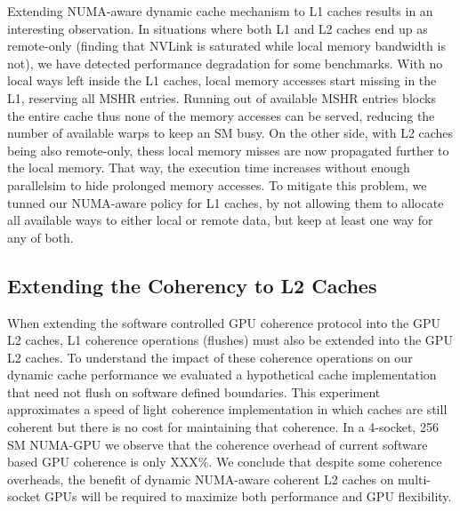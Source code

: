Extending NUMA-aware dynamic cache mechanism to L1 caches results in an interesting observation. In situations where both L1 and L2 caches end up as remote-only (finding that NVLink is saturated while local memory bandwidth is not), we have detected performance degradation for some benchmarks. With no local ways left inside the L1 caches, local memory accesses start missing in the L1, reserving all MSHR entries. Running out of available MSHR entries blocks the entire cache thus none of the memory accesses can be served, reducing the number of available warps to keep an SM busy. On the other side, with L2 caches being also remote-only, thess local memory misses are now propagated further to the local memory. That way, the execution time increases without enough parallelsim to hide prolonged memory accesses. To mitigate this problem, we tunned our NUMA-aware policy for L1 caches, by not allowing them to allocate all available ways to either local or remote data, but keep at least one way for any of both. 




\subsection{Extending the Coherency to L2 Caches}


When extending the software controlled GPU coherence protocol into the GPU L2 caches,
L1 coherence operations (flushes) must also be extended into the GPU L2 caches.  To understand
the impact of these coherence operations on our dynamic cache performance we evaluated a hypothetical
cache implementation that need not flush on software defined boundaries.  This experiment
approximates a speed of light coherence implementation in which caches are still coherent but
there is no cost for maintaining that coherence.  In a 4-socket, 256 SM NUMA-GPU we observe
that the coherence overhead of current software based GPU coherence is only XXX\%.  We conclude
that despite some coherence overheads, the benefit of dynamic NUMA-aware coherent L2 caches
on multi-socket GPUs will be required to maximize both performance and GPU flexibility.

